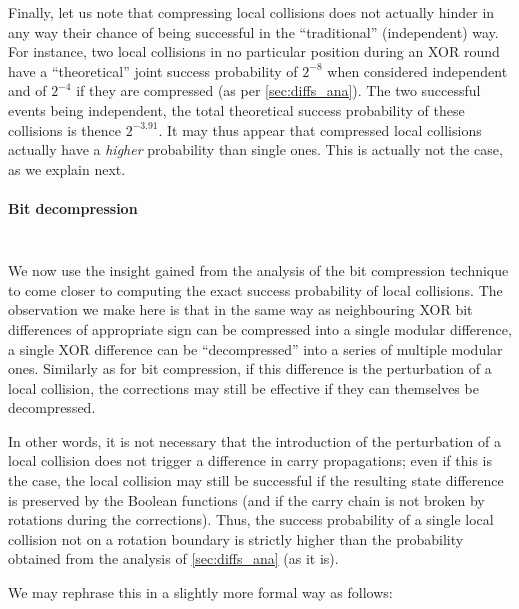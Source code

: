 Finally, let us note that compressing local collisions does not actually hinder in any way their
chance of being successful in the ``traditional'' (independent) way. For instance, two local collisions in no particular position during an XOR round have a ``theoretical'' joint success probability of
$2^{-8}$ when considered independent and of $2^{-4}$ if they are compressed (as per \autoref{sec:diffs_ana}). The two successful events being independent, the total theoretical success probability of these collisions is thence $2^{-3.91}$.
It may thus appear that compressed local collisions actually have a \emph{higher} probability than single ones. This is actually not the case, as we explain next.

\paragraph{Bit decompression}
$\phantom{bouh}$

\medskip

\noindent
We now use the insight gained from the analysis of the bit compression technique to come closer to computing the exact success probability of local collisions.
The observation we make here is that in the same way as neighbouring XOR bit differences of appropriate sign can be compressed into a single modular difference, a single XOR difference
can be ``decompressed'' into a series of multiple modular ones. Similarly as for bit compression, if this difference is the perturbation of a local collision, the corrections may still be effective
if they can themselves be decompressed.

In other words, it is not necessary that the introduction of the perturbation of a local collision does not trigger a difference in carry propagations; even if this is the case, the local
collision may still be successful if the resulting state difference is preserved by the Boolean functions (and if the carry chain is not broken by rotations during the corrections). Thus, the success probability of
a single local collision not on a rotation boundary is strictly higher than the probability obtained from the analysis of \autoref{sec:diffs_ana} (as it is).

We may rephrase this in a slightly more formal way as follows:

\medskip

